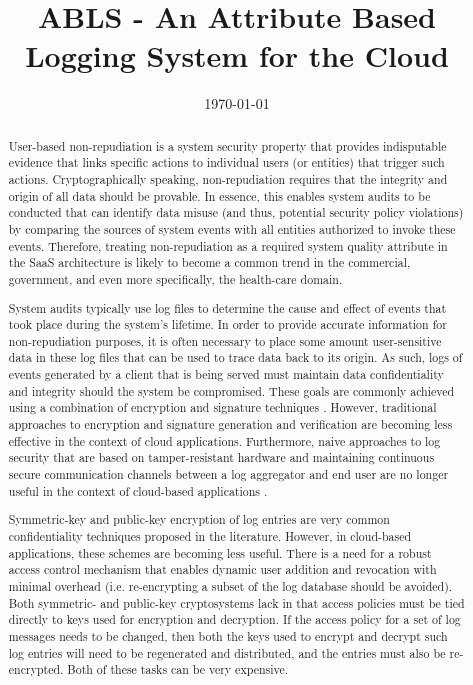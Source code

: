 \documentclass{sig-alternate}
\begin{document}
\title{ABLS - An Attribute Based Logging System for the Cloud}
\author{
}
\date{\today}
\maketitle
\begin{abstract}

User-based non-repudiation is a system security property that provides indisputable evidence that links
specific actions to individual users (or entities) that trigger such actions. Cryptographically speaking, non-repudiation requires that the integrity and 
origin of all data should be provable. In essence, this enables system audits to be conducted that can
identify data misuse (and thus, potential security policy violations) by comparing the sources of system events
with all entities authorized to invoke these events. Therefore, treating non-repudiation as a required system 
quality attribute in the SaaS architecture is likely to become a common trend in the commercial, 
government, and even more specifically, the health-care domain.

System audits typically use log files to determine the cause and effect of events that took 
place during the system's lifetime. In order to provide accurate information for non-repudiation purposes,
it is often necessary to place some amount user-sensitive data in these log files that can be used
to trace data back to its origin. As such, logs of events generated by a client that is being served must
maintain data confidentiality and integrity should the system be compromised. These goals are commonly achieved
using a combination of encryption and signature techniques \cite{Ma2008-FssAgg}. However, traditional approaches to
encryption and signature generation and verification are becoming less effective in the context of cloud
applications. Furthermore, naive approaches to log security that are based on tamper-resistant hardware and 
maintaining continuous secure communication channels between a log aggregator and end user are no longer useful in 
the context of cloud-based applications \cite{Schneier1999-Secure}. 

Symmetric-key and public-key encryption of log entries are very common confidentiality techniques 
proposed in the literature. However, in cloud-based applications, these schemes are becoming less useful.
There is a need for a robust access control mechanism that enables dynamic user addition and revocation
with minimal overhead (i.e. re-encrypting a subset of the log database should be avoided). Both symmetric- and 
public-key cryptosystems lack in that access policies must be tied directly to keys used for
encryption and decryption. If the access policy for a set of log messages needs to be changed, then both the keys used to
encrypt and decrypt such log entries will need to be regenerated and distributed, and the entries must also
be re-encrypted. Both of these tasks can be very expensive. 


\end{abstract}
\end{document}

